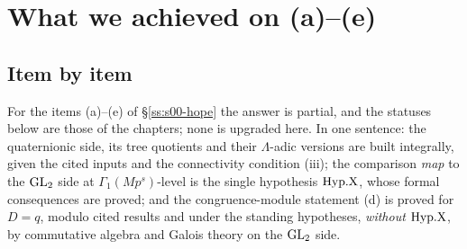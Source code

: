 \section{What we achieved on (a)--(e)}\label{ss:s00-question}

\subsection{Item by item}\label{ss:s00-achieved}
For the items (a)--(e) of \S\ref{ss:s00-hope} the answer is partial, and the statuses below are those of the chapters; none is upgraded here. In one sentence: the
quaternionic side, its tree quotients and their $\Lambda$-adic versions are built integrally, given the cited
inputs and the connectivity condition (iii); the comparison \emph{map} to the $\mathrm{GL}_2$ side at $\Gamma_1(Mp^s)$-level is the
single hypothesis $\mathrm{Hyp.X}$, whose formal consequences are proved; and the congruence-module statement (d) is proved for
$D=q$, modulo cited results and under the standing hypotheses, \emph{without} $\mathrm{Hyp.X}$, by commutative algebra and Galois theory on the $\mathrm{GL}_2$ side.

